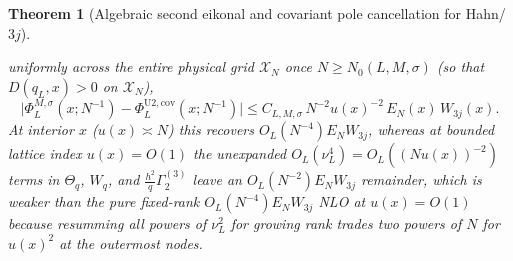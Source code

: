 \documentclass[11pt]{article}
\newtheorem{theorem}{Theorem}[section]
\theoremstyle{definition}
\theoremstyle{remark}
\newcommand{\cX}{\mathcal{X}}
\renewcommand{\_}{\oldunderscore\penalty0\hskip0pt\relax}
\begin{document}
\begin{theorem}[Algebraic second eikonal and covariant pole cancellation for Hahn/$3j$]
\begin{enumerate}[label=(\alph*),leftmargin=2em,itemsep=2pt]
  uniformly across the entire physical grid $\cX_N$ once $N\ge N_0(L,M,\sigma)$ (so that $D(q_L,x)>0$ on $\cX_N$),
\begin{equation}
  \bigl|\Phi_L^{M,\sigma}(x;N^{-1}) - \Phi_L^{\mathrm{U2,cov}}(x;N^{-1})\bigr| \le C_{L,M,\sigma}\,N^{-2}u(x)^{-2}\,E_N(x)\,W_{3j}(x).
  \label{eq:fixed-L-N4}
\end{equation}
At interior $x$ ($u(x)\asymp N$) this recovers $O_L(N^{-4})E_N W_{3j}$, whereas at bounded lattice index $u(x)=O(1)$ the
  unexpanded $O_L(\nu_L^4)=O_L((Nu(x))^{-2})$ terms in $\Theta_q$, $W_q$, and $\frac{h^2}{q}\Gamma_2^{(3)}$ leave an
  $O_L(N^{-2})E_N W_{3j}$ remainder, which is weaker than the pure fixed-rank $O_L(N^{-4})E_N W_{3j}$ NLO
  \cite[Corollary~10.3]{LewisFixedRank} at $u(x)=O(1)$ because resumming all powers of $\nu_L^2$ for growing rank trades two powers of $N$
  for $u(x)^2$ at the outermost nodes.
\end{enumerate}
\end{theorem}
\end{document}
